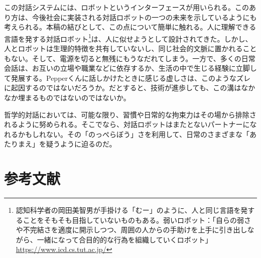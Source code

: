 \documentclass[b5j,twoside,twocolumn]{utarticle}
\begin{document}
この対話システムには、ロボットというインターフェースが用いられる。このあり方は、今後社会に実装される対話ロボットの一つの未来を示しているようにも考えられる。本稿の結びとして、この点について簡単に触れる。人に理解できる言語を発する対話ロボット\footnote{認知科学者の岡田美智男が手掛ける「むー」のように、人と同じ言語を発することをそもそも目指していないものもある。弱いロボット：「自らの弱さや不完結さを適度に開示しつつ、周囲の人からの手助けを上手に引き出しながら、一緒になって合目的的な行為を組織していくロボット」\url{https://www.icd.cs.tut.ac.jp/}}は、人に似せようとして設計されてきた。しかし、人とロボットは生理的特徴を共有していないし、同じ社会的文脈に置かれることもない。そして、電源を切ると無残にもうなだれてしまう。一方で、多くの日常会話は、お互いの立場や職業などに依存するか、生活の中で生じる経験に立脚して発展する。Pepperくんに話しかけたときに感じる虚しさは、このようなズレに起因するのではないだろうか。だとすると、技術が進歩しても、この溝はなかなか埋まるものではないのではないか。


哲学的対話においては、可能な限り、習慣や日常的な拘束力はその場から排除されるように努められる。そこでなら、対話ロボットはまたとないパートナーになれるかもしれない。その「のっぺらぼう」さを利用して、日常のさまざまな「あたりまえ」を疑うように迫るのだ。\\



\section*{参考文献}%

\end{document}
